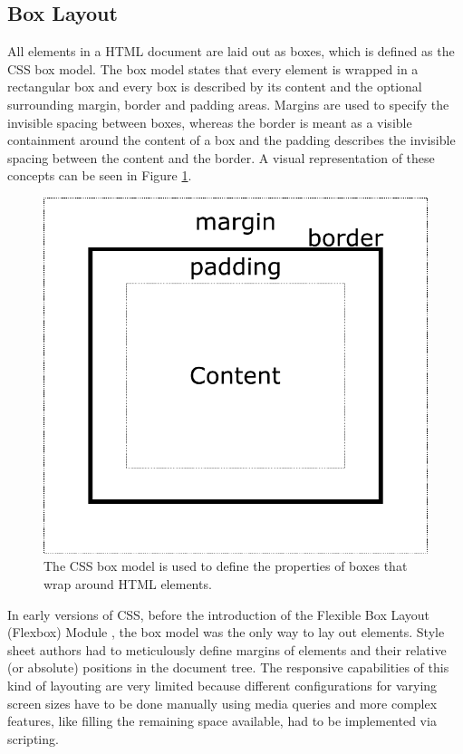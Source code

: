 \subsection{Box Layout}

All elements in a HTML document are laid out as boxes, which is defined as the CSS box model. The box model states that every element is wrapped in a rectangular box and every box is described by its content and the optional surrounding margin, border and padding areas. Margins are used to specify the invisible spacing between boxes, whereas the border is meant as a visible containment around the content of a box and the padding describes the invisible spacing between the content and the border. A visual representation of these concepts can be seen in Figure \ref{fig:BoxModel}.

\begin{figure}[tp]
    \centering
    \includegraphics[keepaspectratio,width=\linewidth,height=\fullh / 3]
    {diagrams/box-model.pdf}

    \caption[CSS Box Model]{
        The CSS box model is used to define the properties of boxes that wrap around HTML elements.
    }
    \label{fig:BoxModel}
\end{figure}

In early versions of CSS, before the introduction of the Flexible Box Layout (Flexbox) Module \parencite{CSSFlexboxFirstDraft}, the box model was the only way to lay out elements. Style sheet authors had to meticulously define margins of elements and their relative (or absolute) positions in the document tree. The responsive capabilities of this kind of layouting are very limited because different configurations for varying screen sizes have to be done manually using media queries and more complex features, like filling the remaining space available, had to be implemented via scripting.

